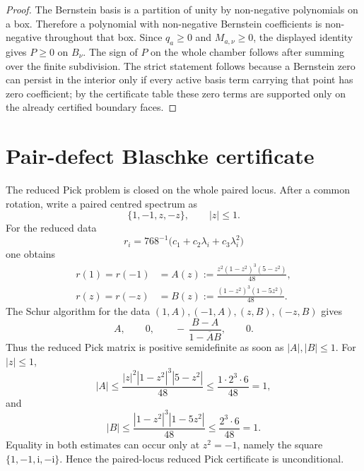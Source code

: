 \documentclass[11pt]{article}
\numberwithin{equation}{section}
\newcommand{\ii}{\mathrm i}
\begin{document}
\begin{proof}
The Bernstein basis is a partition of unity by non-negative polynomials on a
box.  Therefore a polynomial with non-negative Bernstein coefficients is
non-negative throughout that box.  Since \(q_a\ge0\) and
\(M_{a,\nu}\ge0\), the displayed identity gives \(P\ge0\) on \(B_\nu\).
The sign of \(P\) on the whole chamber follows after summing over the finite
subdivision.  The strict statement follows because a Bernstein zero can persist
in the interior only if every active basis term carrying that point has zero
coefficient; by the certificate table these zero terms are supported only on
the already certified boundary faces.
\end{proof}

\section{Pair-defect Blaschke certificate}\label{app:pair-defect-blaschke}
The reduced Pick problem is closed on the whole paired locus.  After a common
rotation, write a paired centred spectrum as
\[
  \{1,-1,z,-z\},\qquad |z|\le1.
\]
For the reduced data
\[
  r_i=768^{-1}\bigl(c_1+c_2\lambda_i+c_3\lambda_i^2\bigr)
\]
one obtains
\[
\begin{aligned}
  r(1)=r(-1)&=A(z):=\frac{z^2(1-z^2)^3(5-z^2)}{48},\\
  r(z)=r(-z)&=B(z):=\frac{(1-z^2)^3(1-5z^2)}{48}.
\end{aligned}
\]
The Schur algorithm for the data
\((1,A),(-1,A),(z,B),(-z,B)\) gives
\[
  A,\qquad 0,\qquad -\,\frac{B-A}{1-\overline A B},\qquad 0.
\]
Thus the reduced Pick matrix is positive semidefinite as soon as
\(|A|,|B|\le1\).  For \(|z|\le1\),
\[
  |A|\le \frac{|z|^2|1-z^2|^3|5-z^2|}{48}
  \le \frac{1\cdot 2^3\cdot 6}{48}=1,
\]
and
\[
  |B|\le \frac{|1-z^2|^3|1-5z^2|}{48}
  \le \frac{2^3\cdot 6}{48}=1.
\]
Equality in both estimates can occur only at \(z^2=-1\), namely the square
\(\{1,-1,\ii,-\ii\}\).  Hence the paired-locus reduced Pick certificate is
unconditional.
\end{document}
